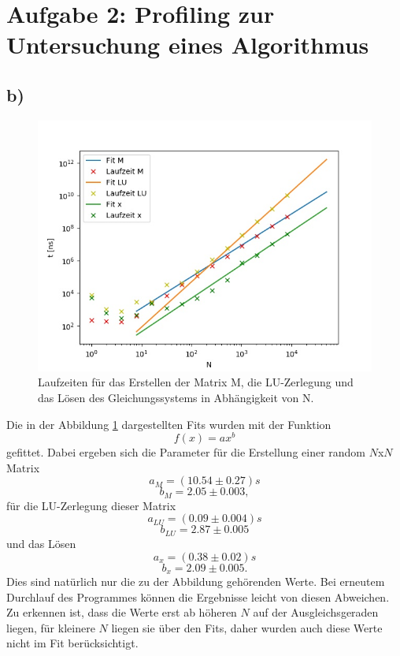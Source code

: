 \section*{Aufgabe 2: Profiling zur Untersuchung eines Algorithmus}

\subsection*{b)}

  \begin{figure}
    \includegraphics{../Blatt2/Plots/plot2.jpg}
    \caption{Laufzeiten für das Erstellen der Matrix M, die LU-Zerlegung und das Lösen des Gleichungssystems in Abhängigkeit von N.}
    \label{fig:A2}
  \end{figure}

  \noindent Die in der Abbildung \ref{fig:A2} dargestellten Fits wurden mit der Funktion
  \begin{equation}
    f(x)=a x^b
  \end{equation}
  gefittet. Dabei ergeben sich die Parameter für die Erstellung einer random $N$x$N$ Matrix
  $$a_M = (10.54 \pm 0.27) s$$
  $$b_M = 2.05 \pm 0.003 ,$$
  für die LU-Zerlegung dieser Matrix
  $$a_{LU} = (0.09 \pm 0.004) s$$
  $$b_{LU} = 2.87 \pm 0.005$$
  und das Lösen
  $$a_x = (0.38 \pm 0.02) s$$
  $$b_x = 2.09 \pm 0.005.$$
  Dies sind natürlich nur die zu der Abbildung gehörenden Werte. Bei erneutem Durchlauf des Programmes
  können die Ergebnisse leicht von diesen Abweichen. Zu erkennen ist, dass die Werte erst ab höheren $N$
  auf der Ausgleichsgeraden liegen, für kleinere $N$ liegen sie über den Fits, daher wurden auch diese
  Werte nicht im Fit berücksichtigt.

